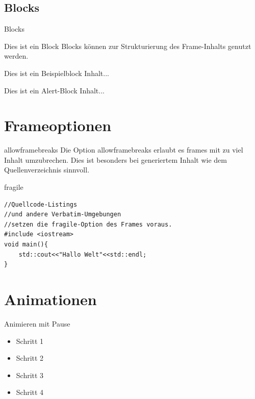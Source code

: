 \documentclass[t,aspectratio=169,dvipsnames]{beamer}
\begin{document}
\subsection{Blocks}
\begin{frame}{Blocks}
\begin{block}{Dies ist ein Block}
	Blocks können zur Strukturierung des Frame-Inhalts genutzt werden.
\end{block}
\begin{exampleblock}{Dies ist ein Beispielblock}
	Inhalt...
\end{exampleblock}
\begin{alertblock}{Dies ist ein Alert-Block}
	Inhalt...
\end{alertblock}
\end{frame}

\section{Frameoptionen}
\begin{frame}[allowframebreaks]{allowframebreaks}
	Die Option allowframebreaks erlaubt es frames mit zu viel Inhalt umzubrechen. Dies ist besonders bei generiertem Inhalt wie dem Quellenverzeichnis sinnvoll.
	\\[1cm]
	\lipsum[1-2]
\end{frame}

\begin{frame}[fragile]{fragile}
\begin{lstlisting}
//Quellcode-Listings
//und andere Verbatim-Umgebungen
//setzen die fragile-Option des Frames voraus.
#include <iostream>
void main(){
	std::cout<<"Hallo Welt"<<std::endl;
}
\end{lstlisting}
\end{frame}

\section{Animationen}

\begin{frame}{Animieren mit Pause}
\begin{itemize}
	\item Schritt 1
	\item Schritt 2
	\pause
	\item Schritt 3
	\item Schritt 4
\end{itemize}
\end{frame}
\end{document}
